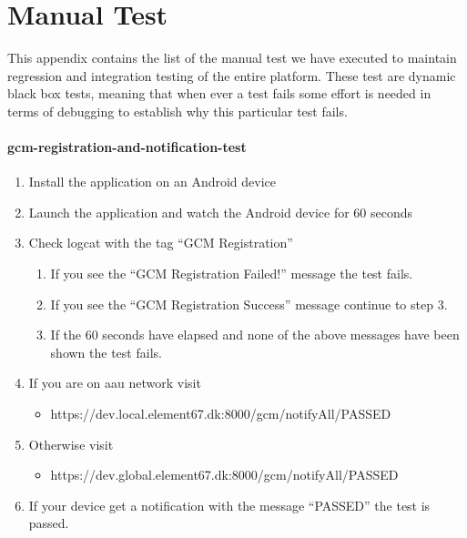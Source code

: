 
\chapter{Manual Test}
\label{app:manual_test}

This appendix contains the list of the manual test we have executed to maintain regression and integration testing of the entire platform. These test are dynamic black box tests, meaning that when ever a test fails some effort is needed in terms of debugging to establish why this particular test fails. 

\subsubsection{gcm-registration-and-notification-test}

\begin{enumerate}
    \item Install the application on an Android device
    \item Launch the application and watch the Android device for 60 seconds
    \item Check logcat with the tag ``GCM Registration''
        \begin{enumerate}
            \item If you see the ``GCM Registration Failed!'' message the test fails.
            \item If you see the ``GCM Registration Success'' message continue to step 3.
            \item If the 60 seconds have elapsed and none of the above messages have been shown the test fails.
        \end{enumerate}
    \item If you are on aau network visit
        \begin{itemize}
            \item https://dev.local.element67.dk:8000/gcm/notifyAll/PASSED
        \end{itemize}
    \item Otherwise visit
        \begin{itemize}
            \item https://dev.global.element67.dk:8000/gcm/notifyAll/PASSED
        \end{itemize}
    \item If your device get a notification with the message ``PASSED'' the test is passed.
\end{enumerate}

